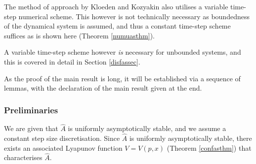 The method of approach by Kloeden and Kozyakin also utilises a variable
time-step numerical scheme. This however is not technically necessary as
boundedness of the dynamical system is assumed, and thus a constant time-step
scheme suffices as is shown here (Theorem \ref{numuasthm}).

A variable time-step scheme however \textit{is} necessary for unbounded systems,
and this is covered in detail in Section \ref{disfassec}.

As the proof of the main result is long, it will be established via a sequence
of lemmas, with the declaration of the main result given at the end.

\subsubsection{Preliminaries}

We are given that $\hat{A}$ is uniformly asymptotically stable, and we assume a
constant step size discretisation. Since $\hat{A}$ is uniformly asymptotically
stable, there exists an associated Lyapunov function $V = V(p, x)$ (Theorem
\ref{confasthm}) that characterises $\hat{A}$.

